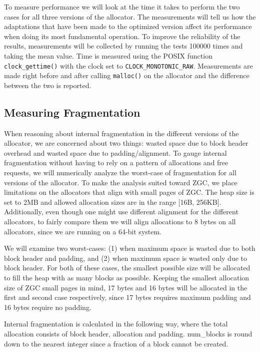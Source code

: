 To measure performance we will look at the time it takes to perform the two cases for all three versions of the allocator. The measurements will tell us how the adaptations that have been made to the optimized version affect its performance when doing its most fundamental operation. To improve the reliability of the results, measurements will be collected by running the tests 100000 times and taking the mean value. Time is measured using the POSIX function \texttt{clock\_gettime()} with the clock set to \texttt{CLOCK\_MONOTONIC\_RAW}. Measurements are made right before and after calling \texttt{malloc()} on the allocator and the difference between the two is reported.

\subsection{Measuring Fragmentation}

When reasoning about internal fragmentation in the different versions of the allocator, we are concerned about two things: wasted space due to block header overhead and wasted space due to padding/alignment. To gauge internal fragmentation without having to rely on a pattern of allocations and free requests, we will numerically analyze the worst-case of fragmentation for all versions of the allocator. To make the analysis suited toward ZGC, we place limitations on the allocators that align with small pages of ZGC. The heap size is set to 2MB and allowed allocation sizes are in the range [16B, 256KB]. Additionally, even though one might use different alignment for the different allocators, to fairly compare them we will align allocations to 8 bytes on all allocators, since we are running on a 64-bit system.

We will examine two worst-cases: (1) when maximum space is wasted due to both block header and padding, and (2) when maximum space is wasted only due to block header. For both of these cases, the smallest possible size will be allocated to fill the heap with as many blocks as possible. Keeping the smallest allocation size of ZGC small pages in mind, 17 bytes and 16 bytes will be allocated in the first and second case respectively, since 17 bytes requires maximum padding and 16 bytes require no padding.

Internal fragmentation is calculated in the following way, where the total allocation consists of block header, allocation and padding. num\_blocks is round down to the nearest integer since a fraction of a block cannot be created.

